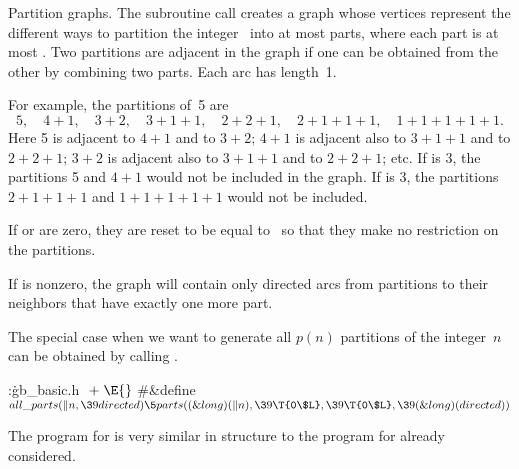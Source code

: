 Partition graphs. The subroutine call
creates a graph whose vertices represent the different ways to partition
the integer~ into at most  parts, where each part is
at most
. Two partitions are adjacent in the graph if
one can be obtained from the other by combining two parts.
Each arc has length~1.

For example, the partitions of~5 are
$$5,\quad 4+1,\quad 3+2,\quad 3+1+1,\quad 2+2+1,
\quad 2+1+1+1,\quad 1+1+1+1+1.$$
Here 5 is adjacent to $4+1$ and to $3+2$; $4+1$ is adjacent also to
$3+1+1$ and to $2+2+1$; $3+2$ is adjacent also to $3+1+1$ and to $2+2+1$; etc.
If  is 3, the partitions 5 and $4+1$ would not be included in
the graph. If  is 3, the partitions $2+1+1+1$ and
$1+1+1+1+1$
would not be included.

If  or  are zero, they are reset to be
equal to~
so that they make no restriction on the partitions.

If  is nonzero, the graph will contain only directed arcs from
partitions to their neighbors that have exactly one more part.

The special case when we want to generate all $p(n)$ partitions of the
integer~$n$ can be obtained by calling .

\Y\B\4:\.{gb\_basic.h }\X${}\mathrel+\E{}$\6
\8\#\&{define} ${}\\{all\_parts}(\|n,\39\\{directed}) \5\\{parts}((\&{long})(%
\|n),\39\T{0\$L},\39\T{0\$L},\39(\&{long})(\\{directed})){}$\par
\fi

The program for  is very similar in structure to the
program
for  already considered.

